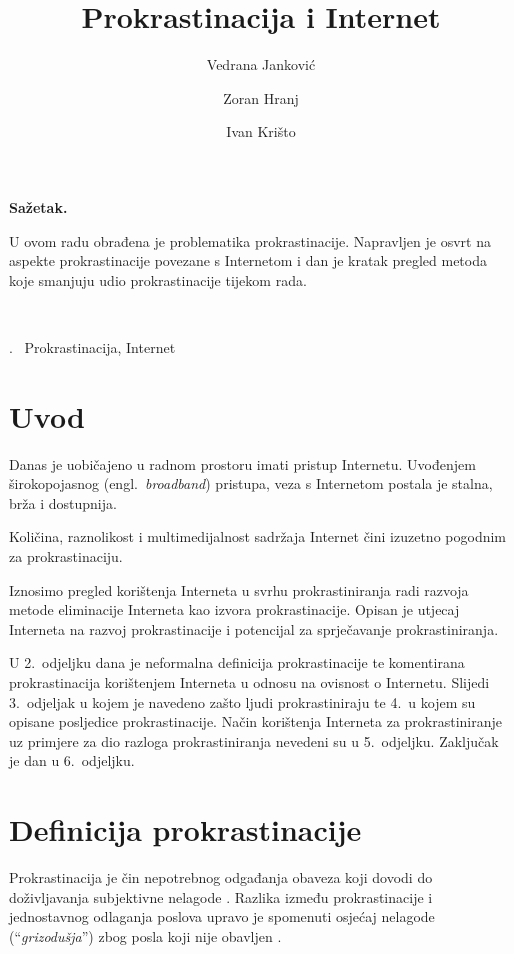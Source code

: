 \documentclass[11pt,english]{article}
\let\LaTeXtitle\title
\renewcommand{\title}[1]{\LaTeXtitle{\Large \textbf{#1}}}
\renewenvironment{abstract}
{\noindent \large \bf Sažetak.\normalsize\begin{it}}
{\end{it}\\}
\newenvironment{keywords}
{\noindent {\large {\bf Ključne riječi}}.~}{}
\newcommand{\engl}[1]{(engl.~\emph{#1})}
\begin{document}
\title{Prokrastinacija i Internet}
\author{Vedrana Janković}
\author{Zoran Hranj}
\author{Ivan Krišto}

\date{}

\maketitle
\thispagestyle{empty}
\pagestyle{empty}
\begin{multicols}{2}

\begin{abstract}
U ovom radu obrađena je problematika prokrastinacije. Napravljen je 
osvrt na aspekte prokrastinacije povezane s Internetom i dan je kratak 
pregled metoda koje smanjuju udio prokrastinacije tijekom rada.
\end{abstract}

\begin{keywords}
Prokrastinacija, Internet
\end{keywords}

\section{Uvod}
Danas je uobičajeno u radnom prostoru imati pristup Internetu. Uvođenjem
širokopojasnog \engl{broadband} pristupa, veza s Internetom postala je stalna,
brža i dostupnija.

Količina, raznolikost i multimedijalnost sadržaja Internet čini izuzetno
pogodnim za prokrastinaciju.

Iznosimo pregled korištenja Interneta u svrhu prokrastiniranja radi razvoja
metode eliminacije Interneta kao izvora prokrastinacije. Opisan je utjecaj 
Interneta na razvoj prokrastinacije i potencijal za sprječavanje prokrastiniranja.

U 2.~odjeljku dana je neformalna definicija prokrastinacije te komentirana
prokrastinacija korištenjem Interneta u odnosu na ovisnost o Internetu. Slijedi
3.~odjeljak u kojem je navedeno zašto ljudi prokrastiniraju te 4.~u kojem su
opisane posljedice prokrastinacije. Način korištenja Interneta za
prokrastiniranje uz primjere za dio razloga prokrastiniranja nevedeni su u
5.~odjeljku. Zaključak je dan u 6.~odjeljku.

\section{Definicija prokrastinacije}
Prokrastinacija je čin nepotrebnog odgađanja obaveza koji dovodi do 
doživljavanja subjektivne nelagode \cite{solomon1984academic}. Razlika između
prokrastinacije i jednostavnog odlaganja poslova upravo je spomenuti osjećaj
nelagode (``\emph{grizodušja}'') zbog posla koji nije obavljen
\cite{burka2004procrastination}.


\end{multicols}
\end{document}
